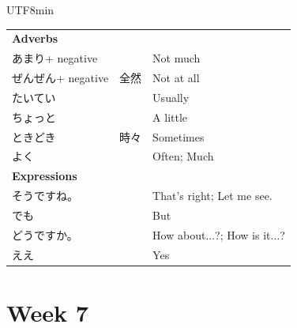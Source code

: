 \documentclass[11pt]{article}
\begin{document}
\begin{CJK}{UTF8}{min}
\begin{tabularx}{\linewidth}{X | X | X}
    \textbf{Adverbs} &  & \\
    あまり+ negative &  & Not much \\
    ぜんぜん+ negative & 全然 & Not at all \\
    たいてい &  & Usually \\
    ちょっと &  & A little \\
    ときどき & 時々 & Sometimes \\
    よく &  & Often; Much \\
    \hline
    \textbf{Expressions} &  & \\
    そうですね。 &  & That's right; Let me see. \\
    でも &  & But \\
    どうですか。 &  & How about...?; How is it...? \\
    ええ &  & Yes \\
    \bottomrule
\end{tabularx}


\newpage
\section{Week 7}


\end{CJK}
\end{document}

